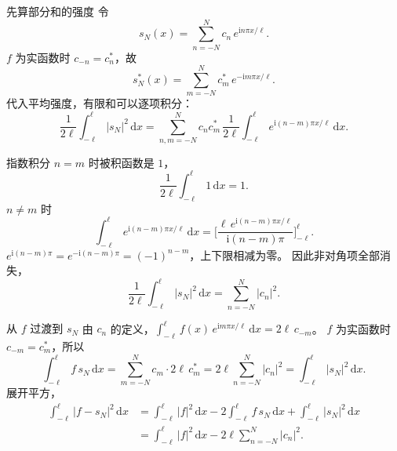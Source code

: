 \documentclass[fontset=windows, chinese, 10pt, xcolor=dvipsnames]{beamer}
\begin{document}
\begin{frame}{先算部分和的强度}
  令
  \begin{equation*}
    s_N(x)=\sum_{n=-N}^{N} c_n\,e^{\mathrm{i} n\pi x/\ell}.
  \end{equation*}
  $f$ 为实函数时 $c_{-n}=c_n^*$，故
  \begin{equation*}
    s_N^*(x)=\sum_{m=-N}^{N} c_m^*\,e^{-\mathrm{i} m\pi x/\ell}.
  \end{equation*}
  代入平均强度，有限和可以逐项积分：
  \begin{equation*}
    \frac{1}{2\ell}\int_{-\ell}^{\ell}|s_N|^2\,\mathrm{d}x
    =\sum_{n,m=-N}^{N} c_n c_m^*\,
      \frac{1}{2\ell}\int_{-\ell}^{\ell}
        e^{\mathrm{i}(n-m)\pi x/\ell}\,\mathrm{d}x.
  \end{equation*}
\end{frame}

\begin{frame}{指数积分}
  $n=m$ 时被积函数是 $1$，
  \begin{equation*}
    \frac{1}{2\ell}\int_{-\ell}^{\ell} 1\,\mathrm{d}x=1.
  \end{equation*}
  $n\neq m$ 时
  \begin{equation*}
    \int_{-\ell}^{\ell} e^{\mathrm{i}(n-m)\pi x/\ell}\,\mathrm{d}x
    =\Biggl[\frac{\ell\,e^{\mathrm{i}(n-m)\pi x/\ell}}{\mathrm{i}(n-m)\pi}\Biggr]_{-\ell}^{\ell}.
  \end{equation*}
  $e^{\mathrm{i}(n-m)\pi}=e^{-\mathrm{i}(n-m)\pi}=(-1)^{n-m}$，上下限相减为零。
  因此非对角项全部消失，
  \begin{equation*}
    \frac{1}{2\ell}\int_{-\ell}^{\ell}|s_N|^2\,\mathrm{d}x
    =\sum_{n=-N}^{N}|c_n|^2.
  \end{equation*}
\end{frame}

\begin{frame}{从 $f$ 过渡到 $s_N$}
  由 $c_n$ 的定义，$\displaystyle\int_{-\ell}^{\ell} f(x)\,e^{\mathrm{i} m\pi x/\ell}\,\mathrm{d}x=2\ell\,c_{-m}$。
  $f$ 为实函数时 $c_{-m}=c_m^*$，所以
  \begin{equation*}
    \int_{-\ell}^{\ell} f\,s_N\,\mathrm{d}x
    =\sum_{m=-N}^{N} c_m\cdot 2\ell\,c_m^*
    =2\ell\sum_{n=-N}^{N}|c_n|^2
    =\int_{-\ell}^{\ell}|s_N|^2\,\mathrm{d}x.
  \end{equation*}
  展开平方，
  \begin{align*}
    \int_{-\ell}^{\ell}|f-s_N|^2\,\mathrm{d}x
    &=\int_{-\ell}^{\ell}|f|^2\,\mathrm{d}x
      -2\int_{-\ell}^{\ell} f\,s_N\,\mathrm{d}x
      +\int_{-\ell}^{\ell}|s_N|^2\,\mathrm{d}x \\
    &=\int_{-\ell}^{\ell}|f|^2\,\mathrm{d}x
      -2\ell\sum_{n=-N}^{N}|c_n|^2.
  \end{align*}
\end{frame}
\end{document}
